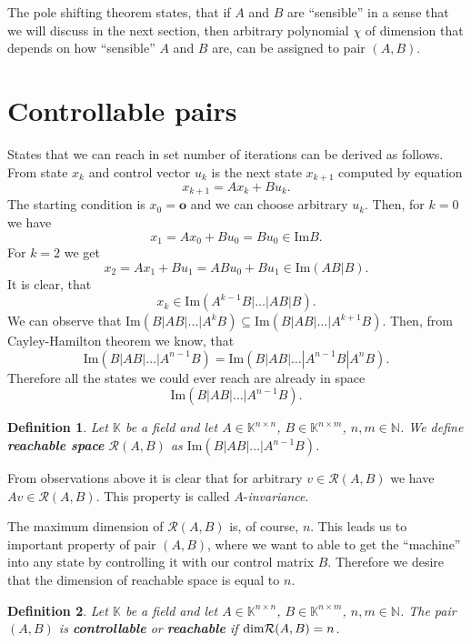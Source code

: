 \documentclass[12pt,a4paper]{report}
\newcommand{\N}{\mathbb{N}}
\newcommand{\K}{\mathbb{K}}
\newtheorem*{definition}{Definition}
\begin{document}
The pole shifting theorem states, that if $A$ and $B$ are ``sensible'' in a sense that we will discuss in the next section, then arbitrary polynomial $\chi$ of dimension that depends on how ``sensible'' $A$ and $B$ are, can be assigned to pair $(A,B)$.

\section{Controllable pairs}

States that we can reach in set number of iterations can be derived as follows. From state $x_k$ and control vector $u_k$ is the next state $x_{k+1}$ computed by equation $$x_{k+1}=Ax_k+Bu_k.$$ The starting condition is $x_0=\textbf{o}$ and we can choose arbitrary $u_k$. Then, for $k=0$ we have $$x_1=Ax_0+Bu_0=Bu_0 \in \text{Im}B.$$ For $k=2$ we get $$x_2=Ax_1+Bu_1=ABu_0+Bu_1\in\text{Im}(AB|B).$$ It is clear, that $$x_k\in\text{Im}(A^{k-1}B|\ldots|AB|B).$$ We can observe that $\text{Im}(B|AB|\ldots|A^kB) \subseteq \text{Im}(B|AB|\ldots|A^{k+1}B)$. Then, from Cayley-Hamilton theorem we know, that $$\text{Im}(B|AB|\ldots|A^{n-1}B)=\text{Im}(B|AB|\ldots|A^{n-1}B|A^nB).$$ Therefore all the states we could ever reach are already in space $$\text{Im}(B|AB|\ldots|A^{n-1}B).$$

\begin{definition}
	Let $\K$ be a field and let $A \in \K^{n \times n}$, $B \in \K^{n \times m}$, $n,m \in \N$. We define \textnormal{\textbf{reachable space}} $\mathcal{R}(A,B)$ as $\text{Im}(B|AB|\ldots|A^{n-1}B)$.
\end{definition}

From observations above it is clear that for arbitrary $v\in\mathcal{R}(A,B)$ we have $Av\in\mathcal{R}(A,B)$. This property is called $A$-\textit{invariance}.


The maximum dimension of $\mathcal{R}(A,B)$ is, of course, $n$. This leads us to important property of pair $(A,B)$, where we want to able to get the ``machine'' into any state by controlling it with our control matrix $B$. Therefore we desire that the dimension of reachable space is equal to $n$. 

\begin{definition}
	Let $\K$ be a field and let $A \in \K^{n \times n}$, $B \in \K^{n \times m}$, $n,m \in \N$. The pair $(A,B)$ is \textnormal{\textbf{controllable}} or \textnormal{\textbf{reachable}} if $\textnormal{dim}\mathcal{R}(A,B)=n$.
\end{definition}
\end{document}
